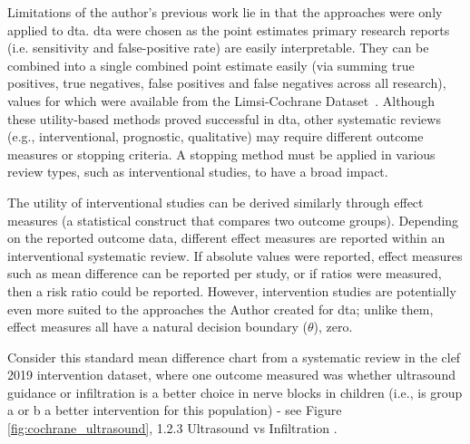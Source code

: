 \documentclass[10pt,oneside]{book}
\begin{document}
Limitations of the author's previous work lie in that the approaches were only applied to \gls*{dta}. \gls*{dta} were chosen as the point estimates primary research reports (i.e. sensitivity and false-positive rate) are easily interpretable. They can be combined into a single combined point estimate easily (via summing true positives, true negatives, false positives and false negatives across all research), values for which were available from the  Limsi-Cochrane Dataset~\cite{norman_cochrane_2018}. Although these utility-based methods proved successful in \gls*{dta}, other systematic reviews (e.g., interventional, prognostic, qualitative) may require different outcome measures or stopping criteria. A stopping method must be applied in various review types, such as interventional studies, to have a broad impact. 

The utility of interventional studies can be derived similarly through effect measures (a statistical construct that compares two outcome groups). Depending on the reported outcome data, different effect measures are reported within an interventional systematic review. If absolute values were reported, effect measures such as mean difference can be reported per study, or if ratios were measured, then a risk ratio could be reported. However, intervention studies are potentially even more suited to the approaches the Author created for \gls*{dta}; unlike them, effect measures all have a natural decision boundary ($\theta$), zero. 

Consider this standard mean difference chart from a systematic review in the \gls*{clef} 2019 intervention dataset, where one outcome measured was whether ultrasound guidance or infiltration is a better choice in nerve blocks in children (i.e., is group a or b a better intervention for this population) - see Figure \ref{fig:cochrane_ultrasound}, 1.2.3 Ultrasound vs Infiltration \cite{the_cochrane_collaboration_use_2014}.
\end{document}
